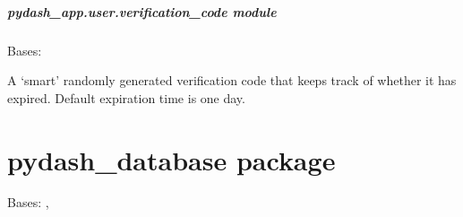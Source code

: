 \documentclass[letterpaper,10pt,english]{sphinxmanual}
\begin{document}
\subparagraph{pydash\_app.user.verification\_code module}
\label{\detokenize{pydash_app.user.verification_code:module-pydash_app.user.verification_code}}\label{\detokenize{pydash_app.user.verification_code:pydash-app-user-verification-code-module}}\label{\detokenize{pydash_app.user.verification_code::doc}}

\begin{fulllineitems}
\label{\detokenize{pydash_app.user.verification_code:pydash_app.user.verification_code.VerificationCode}}
Bases: 

A ‘smart’ randomly generated verification code that keeps track of whether it has expired.
Default expiration time is one day.

\begin{fulllineitems}
\label{\detokenize{pydash_app.user.verification_code:pydash_app.user.verification_code.VerificationCode.is_expired}}
\end{fulllineitems}


\end{fulllineitems}



\section{pydash\_database package}
\label{\detokenize{pydash_database:module-pydash_database}}\label{\detokenize{pydash_database:pydash-database-package}}\label{\detokenize{pydash_database::doc}}

\begin{fulllineitems}
\label{\detokenize{pydash_database:pydash_database.MultiIndexedPersistentCollection}}
Bases: , 

\end{fulllineitems}
\end{document}
